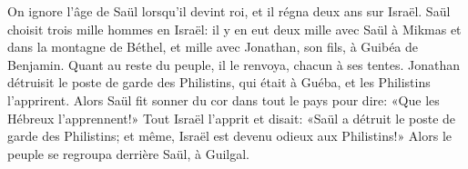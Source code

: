 On ignore l’âge de Saül lorsqu’il devint roi, et il régna deux ans sur Israël.
Saül choisit trois mille hommes en Israël:
	il y en eut deux mille avec Saül à Mikmas et dans la montagne de Béthel,
	et mille avec Jonathan, son fils, à Guibéa de Benjamin.
Quant au reste du peuple, il le renvoya, chacun à ses tentes.
Jonathan détruisit le poste de garde des Philistins, qui était à Guéba,
	et les Philistins l’apprirent.
Alors Saül fit sonner du cor dans tout le pays pour dire:
	«Que les Hébreux l’apprennent!»
Tout Israël l’apprit et disait:
	«Saül a détruit le poste de garde des Philistins;
	et même, Israël est devenu odieux aux Philistins!»
Alors le peuple se regroupa derrière Saül, à Guilgal.

